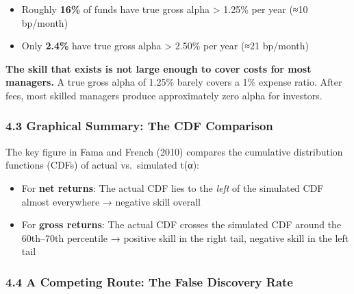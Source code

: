 \documentclass[
  letterpaper,
  DIV=11,
  numbers=noendperiod]{scrartcl}
\providecommand{\tightlist}{%
  \setlength{\itemsep}{0pt}\setlength{\parskip}{0pt}}
\begin{document}
\begin{itemize}
\tightlist
\item
  Roughly \textbf{16\%} of funds have true gross alpha \textgreater{}
  1.25\% per year (≈10 bp/month)
\item
  Only \textbf{2.4\%} have true gross alpha \textgreater{} 2.50\% per
  year (≈21 bp/month)
\end{itemize}

\begin{tcolorbox}[enhanced jigsaw, arc=.35mm, bottomrule=.15mm, bottomtitle=1mm, breakable, colback=white, colbacktitle=quarto-callout-important-color!10!white, colframe=quarto-callout-important-color-frame, coltitle=black, left=2mm, leftrule=.75mm, opacityback=0, opacitybacktitle=0.6, rightrule=.15mm, title=\textcolor{quarto-callout-important-color}{\faExclamation}\hspace{0.5em}{Important}, titlerule=0mm, toprule=.15mm, toptitle=1mm]

\textbf{The skill that exists is not large enough to cover costs for
most managers.} A true gross alpha of 1.25\% barely covers a 1\% expense
ratio. After fees, most skilled managers produce approximately zero
alpha for investors.

\end{tcolorbox}

\subsubsection{4.3 Graphical Summary: The CDF
Comparison}\label{graphical-summary-the-cdf-comparison}

The key figure in Fama and French (2010) compares the cumulative
distribution functions (CDFs) of actual vs.~simulated t(α):

\begin{itemize}
\tightlist
\item
  For \textbf{net returns}: The actual CDF lies to the \emph{left} of
  the simulated CDF almost everywhere → negative skill overall
\item
  For \textbf{gross returns}: The actual CDF crosses the simulated CDF
  around the 60th--70th percentile → positive skill in the right tail,
  negative skill in the left tail
\end{itemize}

\subsubsection{4.4 A Competing Route: The False Discovery
Rate}\label{a-competing-route-the-false-discovery-rate}
\end{document}
